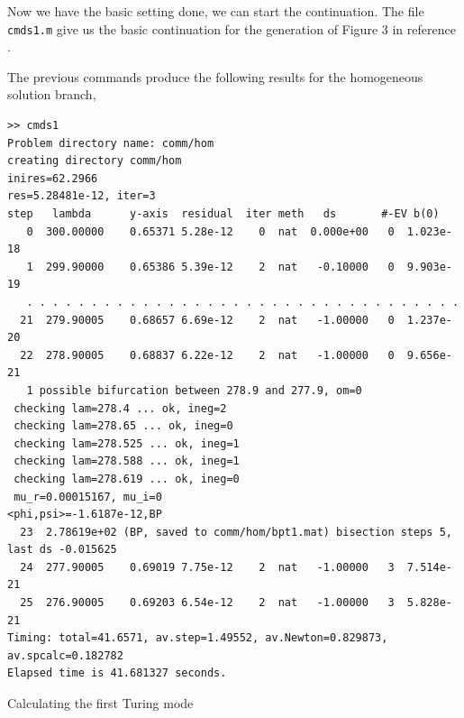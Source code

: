 \documentclass[a4paper,12pt]{article}
\begin{document}
Now we have the basic setting done, we can start the continuation. The file {\tt cmds1.m} give us the basic continuation for the generation of Figure 3 in reference \cite{FPBUM24}.

The previous commands produce the following results for the homogeneous solution branch,
\begin{verbatim}
>> cmds1
Problem directory name: comm/hom
creating directory comm/hom
inires=62.2966
res=5.28481e-12, iter=3
step   lambda      y-axis  residual  iter meth   ds       #-EV b(0)       
   0  300.00000    0.65371 5.28e-12    0  nat  0.000e+00   0  1.023e-18 
   1  299.90000    0.65386 5.39e-12    2  nat   -0.10000   0  9.903e-19 
   . . . . . . . . . . . . . . . . . . . . . . . . . . . . . . . . . . 
  21  279.90005    0.68657 6.69e-12    2  nat   -1.00000   0  1.237e-20 
  22  278.90005    0.68837 6.22e-12    2  nat   -1.00000   0  9.656e-21 
   1 possible bifurcation between 278.9 and 277.9, om=0
 checking lam=278.4 ... ok, ineg=2
 checking lam=278.65 ... ok, ineg=0
 checking lam=278.525 ... ok, ineg=1
 checking lam=278.588 ... ok, ineg=1
 checking lam=278.619 ... ok, ineg=0
 mu_r=0.00015167, mu_i=0 
<phi,psi>=-1.6187e-12,BP
  23  2.78619e+02 (BP, saved to comm/hom/bpt1.mat) bisection steps 5, last ds -0.015625
  24  277.90005    0.69019 7.75e-12    2  nat   -1.00000   3  7.514e-21 
  25  276.90005    0.69203 6.54e-12    2  nat   -1.00000   3  5.828e-21 
Timing: total=41.6571, av.step=1.49552, av.Newton=0.829873, av.spcalc=0.182782
Elapsed time is 41.681327 seconds.
\end{verbatim}
Calculating the first Turing mode
\end{document}
